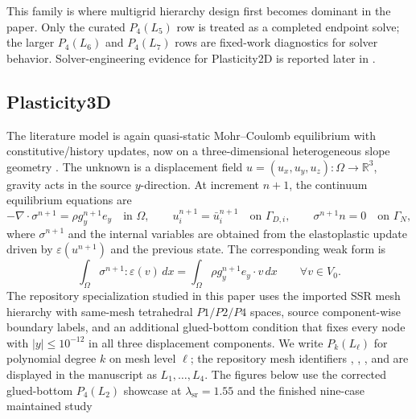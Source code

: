 This family is where multigrid hierarchy design first becomes dominant in the
paper. Only the curated $P_4(L_5)$ row is treated as a completed endpoint
solve; the larger $P_4(L_6)$ and $P_4(L_7)$ rows are fixed-work diagnostics for
solver behavior. Solver-engineering evidence for Plasticity2D is reported
later in .

\subsection{Plasticity3D}
\label{sec:bench-plasticity3d}

The literature model is again quasi-static Mohr--Coulomb equilibrium with
constitutive/history updates, now on a three-dimensional heterogeneous slope
geometry
\citep{davis1968plasticity,simo1985consistent,simo1998compinel,tschuchnigg2015nonassociated,sysala2017returnmapping,sysala2021optimization,sysala2025convexoptimization,sysala2025advancedcontinuation}.
The unknown is a displacement field
$u = (u_x,u_y,u_z): \Omega \to \mathbb{R}^3$, gravity acts in the source
$y$-direction. At increment $n+1$, the continuum equilibrium equations are
\begin{equation}
  -\nabla \cdot \sigma^{n+1} = \rho g_y^{n+1} e_y
  \quad \text{in }\Omega,
  \qquad
  u_i^{n+1} = \bar u_i^{n+1} \quad \text{on }\Gamma_{D,i},
  \qquad
  \sigma^{n+1}n = 0 \quad \text{on }\Gamma_N,
  \label{eq:plasticity3d-strong}
\end{equation}
where $\sigma^{n+1}$ and the internal variables are obtained from the
elastoplastic update driven by $\varepsilon(u^{n+1})$ and the previous state.
The corresponding weak form is
\begin{equation}
  \int_{\Omega} \sigma^{n+1} : \varepsilon(v) \, dx
  =
  \int_{\Omega} \rho g_y^{n+1} e_y \cdot v \, dx
  \qquad \forall v \in V_0.
  \label{eq:plasticity3d-weak}
\end{equation}
The repository specialization studied in this paper uses the imported SSR mesh
hierarchy with same-mesh tetrahedral $P1/P2/P4$ spaces, source component-wise
boundary labels, and an additional glued-bottom condition that fixes every node
with $|y| \le 10^{-12}$ in all three displacement components. We write
$P_k(L_\ell)$ for polynomial degree $k$ on mesh level $\ell$; the repository
mesh identifiers , , , and
 are displayed in the manuscript as $L_1,\ldots,L_4$.
The figures below use the corrected glued-bottom $P_4(L_2)$ showcase at
$\lambda_{\mathrm{sr}}=1.55$ and the finished nine-case maintained study
